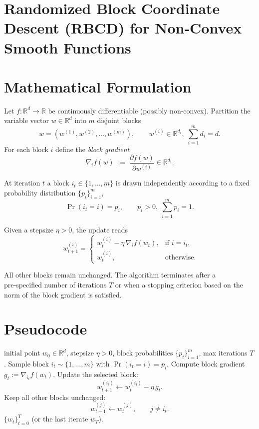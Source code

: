 \documentclass{article}
\newcommand{\R}{\mathbb{R}}
\begin{document}
\section*{Randomized Block Coordinate Descent (RBCD) for Non‑Convex Smooth Functions}

\section*{Mathematical Formulation}
Let $f:\R^{d}\rightarrow\R$ be continuously differentiable (possibly non‑convex).  
Partition the variable vector $w\in\R^{d}$ into $m$ disjoint blocks
\[
w = (w^{(1)},w^{(2)},\dots ,w^{(m)}),\qquad 
w^{(i)}\in\R^{d_i},\; \sum_{i=1}^{m}d_i = d .
\]
For each block $i$ define the \emph{block gradient}
\[
\nabla_i f(w) \;:=\; \frac{\partial f(w)}{\partial w^{(i)}}\in\R^{d_i}.
\]

At iteration $t$ a block $i_t\in\{1,\dots,m\}$ is drawn independently
according to a fixed probability distribution $\{p_i\}_{i=1}^{m}$,
\[
\Pr(i_t=i)=p_i,\qquad p_i>0,\;\sum_{i=1}^{m}p_i=1 .
\]

Given a stepsize $\eta>0$, the update reads
\[
\boxed{\;
w_{t+1}^{(i)}=
\begin{cases}
w_{t}^{(i)}-\eta\,\nabla_i f(w_t), & \text{if } i=i_t,\\[4pt]
w_{t}^{(i)}, & \text{otherwise}.
\end{cases}}
\tag{1}
\]

All other blocks remain unchanged.  The algorithm terminates after a
pre‑specified number of iterations $T$ or when a stopping criterion
based on the norm of the block gradient is satisfied.

\section*{Pseudocode}
\begin{algorithm}[H]
\caption{Randomized Block Coordinate Descent (RBCD)}
\begin{algorithmic}[1]
 initial point $w_0\in\R^{d}$, stepsize $\eta>0$, block probabilities $\{p_i\}_{i=1}^{m}$, max iterations $T$.
    \State Sample block $i_t\sim\{1,\dots,m\}$ with $\Pr(i_t=i)=p_i$.
    \State Compute block gradient $g_t:=\nabla_{i_t}f(w_t)$.
    \State Update the selected block:
    \[
        w_{t+1}^{(i_t)} \gets w_{t}^{(i_t)}-\eta\,g_t .
    \]
    \State Keep all other blocks unchanged:
    \[
        w_{t+1}^{(j)}\gets w_{t}^{(j)},\qquad j\neq i_t .
    \]
\EndFor
{} $\{w_t\}_{t=0}^{T}$ (or the last iterate $w_T$).
\end{algorithmic}
\end{algorithm}
\end{document}
